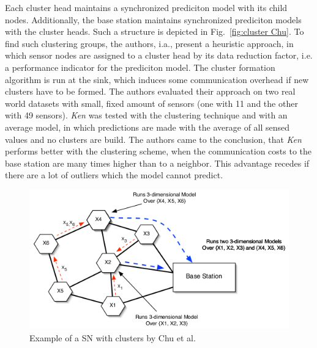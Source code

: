 Each cluster head maintains a synchronized prediciton model with its child
nodes. Additionally, the base station maintains synchronized prediciton models
with the cluster heads. Such a structure is depicted in Fig.~\ref{fig:cluster
Chu}. To find such clustering groups, the authors, i.a., present a heuristic
approach, in which sensor nodes are assigned to a cluster head by its data
reduction factor, i.e. a performance indicator for the prediciton model. The
cluster formation algorithm is run at the sink, which induces some
communication overhead if new clusters have to be formed. The authors evaluated
their approach on two real world datasets with small, fixed amount of sensors
(one with 11 and the other with 49 sensors). \textit{Ken} was tested with the
clustering technique and with an average model, in which predictions are made
with the average of all sensed values and no clusters are build. The authors
came to the conclusion, that \textit{Ken} performs better with the clustering
scheme, when the communication costs to the base station are many times higher
than to a neighbor. This advantage recedes if there are a lot of outliers which
the model cannot predict.

\begin{figure}[h]
\includegraphics[width=\linewidth]{images/ken-clustering.png}
\caption{Example of a \ac{SN} with clusters by Chu et al.~\cite{chu2006approximate}}
\label{fig:cluster Chu}
\centering
\end{figure}

